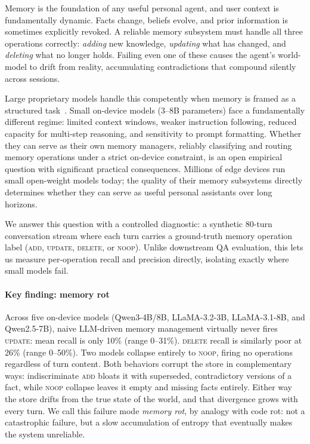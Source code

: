 \documentclass[10pt, twocolumn]{article}
\begin{document}
Memory is the foundation of any useful personal agent, and user context is
fundamentally dynamic. Facts change, beliefs evolve, and prior information
is sometimes explicitly revoked. A reliable memory subsystem must handle all
three operations correctly: \emph{adding} new knowledge, \emph{updating}
what has changed, and \emph{deleting} what no longer holds. Failing even one
of these causes the agent's world-model to drift from reality, accumulating
contradictions that compound silently across sessions.

Large proprietary models handle this competently when memory is framed as a
structured task~\cite{packer2023memgpt}.
Small on-device models (3--8B parameters) face a fundamentally different
regime: limited context windows, weaker instruction following, reduced
capacity for multi-step reasoning, and sensitivity to prompt formatting.
Whether they can serve as their own memory managers, reliably classifying and
routing memory operations under a strict on-device constraint, is an open
empirical question with significant practical consequences.
Millions of edge devices run small open-weight models today; the quality of
their memory subsystems directly determines whether they can serve as useful
personal assistants over long horizons.

We answer this question with a controlled diagnostic: a synthetic 80-turn
conversation stream where each turn carries a ground-truth memory operation
label (\textsc{add}, \textsc{update}, \textsc{delete}, or \textsc{noop}).
Unlike downstream QA evaluation, this lets us measure per-operation recall
and precision directly, isolating exactly where small models fail.

\paragraph{Key finding: memory rot}
Across five on-device models (Qwen3-4B/8B, LLaMA-3.2-3B, LLaMA-3.1-8B,
and Qwen2.5-7B), naive LLM-driven memory management virtually never fires
\textsc{update}: mean recall is only 10\% (range 0--31\%).
\textsc{delete} recall is similarly poor at 26\% (range 0--50\%).
Two models collapse entirely to \textsc{noop}, firing no operations regardless
of turn content.
Both behaviors corrupt the store in complementary ways: indiscriminate
\textsc{add} bloats it with superseded, contradictory versions of a fact,
while \textsc{noop} collapse leaves it empty and missing facts entirely.
Either way the store drifts from the true state of the world, and that
divergence grows with every turn.
We call this failure mode \emph{memory rot}, by analogy with code rot:
not a catastrophic failure, but a slow accumulation of entropy that eventually
makes the system unreliable.
\end{document}
